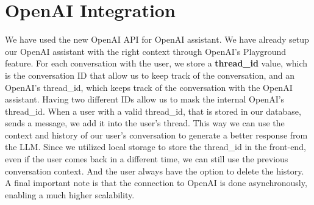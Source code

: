 \section{OpenAI Integration}
We have used the new OpenAI API for OpenAI assistant. We have already setup our OpenAI assistant with the right context through OpenAI's Playground feature. For each conversation with the user, we store a \textbf{thread\_id} value, which is the conversation ID that allow us to keep track of the conversation, and an OpenAI's thread\_id, which keeps track of the conversation with the OpenAI assistant. Having two different IDs allow us to mask the internal OpenAI's thread\_id.
When a user with a valid thread\_id, that is stored in our database, sends a message, we add it into the user's thread.
This way we can use the context and history of our user's conversation to generate a better response from the LLM.
Since we utilized local storage to store the thread\_id in the front-end, even if the user comes back in a different time, we can still use the previous conversation context. And the user always have the option to delete the history.
A final important note is that the connection to OpenAI is done asynchronously, enabling a much higher scalability.
